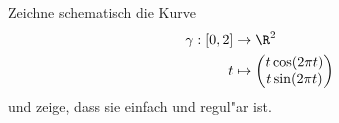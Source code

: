 \begin{prob}
Zeichne schematisch die Kurve
\begin{equation*}
\begin{split}
\gamma:[0,2]&\to\R^2\\
t&\mapsto \begin{pmatrix}
t\cos(2\pi t)\\
t\sin(2\pi t)\\
\end{pmatrix}
\end{split}
\end{equation*}
und zeige, dass sie einfach und regul"ar ist.
\end{prob}
